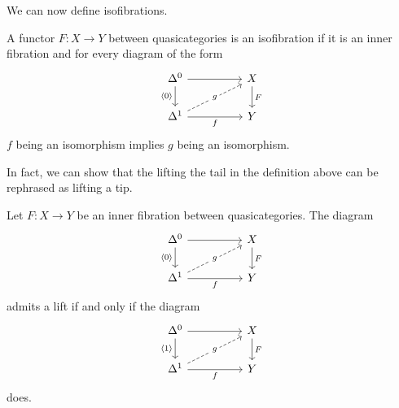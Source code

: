 We can now define isofibrations. 
\begin{definition}\label{def: isofibration}
    A functor $F:X\to Y$ between quasicategories is an isofibration if it is an inner fibration and for every diagram of the form
    $$%
    \begin{tikzcd}
        {\Delta^{0}} && X \\
        {\Delta^{1}} && Y
        \arrow["F", from=1-3, to=2-3]
        \arrow[from=1-1, to=1-3]
        \arrow["f"', from=2-1, to=2-3]
        \arrow["\langle0\rangle"', from=1-1, to=2-1]
        \arrow["g"{description}, dashed, from=2-1, to=1-3]
    \end{tikzcd}$$
    $f$ being an isomorphism implies $g$ being an isomorphism. 
\end{definition}
In fact, we can show that the lifting the tail in the definition above can be rephrased as lifting a tip. 
\begin{lemma}
    Let $F:X\to Y$ be an inner fibration between quasicategories. The diagram 
    $$%
    \begin{tikzcd}
        {\Delta^{0}} && X \\
        {\Delta^{1}} && Y
        \arrow["F", from=1-3, to=2-3]
        \arrow[from=1-1, to=1-3]
        \arrow["f"', from=2-1, to=2-3]
        \arrow["\langle0\rangle"', from=1-1, to=2-1]
        \arrow["g"{description}, dashed, from=2-1, to=1-3]
    \end{tikzcd}$$
    admits a lift if and only if the diagram 
    $$%
    \begin{tikzcd}
        {\Delta^{0}} && X \\
        {\Delta^{1}} && Y
        \arrow["F", from=1-3, to=2-3]
        \arrow[from=1-1, to=1-3]
        \arrow["f"', from=2-1, to=2-3]
        \arrow["\langle1\rangle"', from=1-1, to=2-1]
        \arrow["g"{description}, dashed, from=2-1, to=1-3]
    \end{tikzcd}$$
    does. 
\end{lemma}
